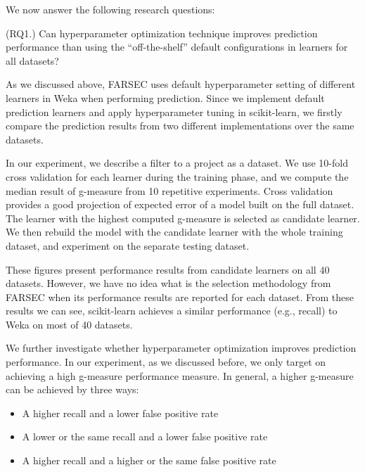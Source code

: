We now answer the following research questions:

\begin{tcolorbox}[enhanced,width=3.4in,size=fbox,
    fontupper=\normalsize\bfseries,drop shadow southwest,sharp corners]
(RQ1.) Can hyperparameter optimization technique improves prediction performance than using the ``off-the-shelf'' default configurations in learners for all datasets?
\end{tcolorbox}

As we discussed above, FARSEC uses default hyperparameter setting of different learners in Weka when performing prediction. Since we implement default prediction learners and apply hyperparameter tuning in scikit-learn, we firstly compare the prediction results from two different implementations over the same datasets. 

In our experiment, we describe a filter to a project as a dataset. We use 10-fold cross validation for each learner during the training phase, and we compute the median result of g-measure from 10 repetitive experiments. Cross validation provides a good projection of expected error of a model built on the full dataset. The learner with the highest computed g-measure is selected as candidate learner. We then rebuild the model with the candidate learner with the whole training dataset, and experiment on the separate testing dataset. 

These figures present performance results from candidate learners on all 40 datasets. However, we have no idea what is the selection methodology from FARSEC when its performance results are reported for each dataset. From these results we can see, scikit-learn achieves a similar performance (e.g., recall) to Weka on  most of 40 datasets.

We further investigate whether hyperparameter optimization improves prediction performance. In our experiment, as we discussed before, we only target on achieving a high g-measure performance measure. In general, a higher g-measure can be achieved by three ways:

\begin{itemize}
    \item A higher recall and a lower false positive rate
    \item A lower or the same recall and a lower false positive rate
    \item A higher recall and a higher or the same false positive rate
\end{itemize}

